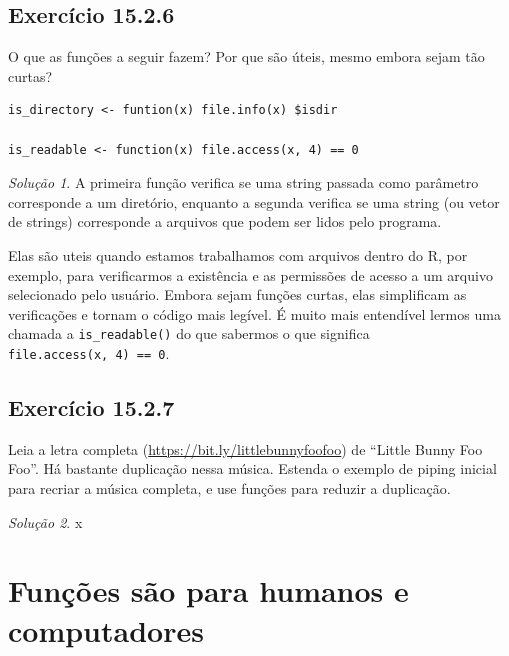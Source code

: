 \documentclass[
]{latex/krantz}
\theoremstyle{definition}
\theoremstyle{definition}
\theoremstyle{definition}
\theoremstyle{definition}
\theoremstyle{remark}
\newtheorem*{solution}{Solução}
\begin{document}
\hypertarget{exr15-2-6}{%
\subsection*{Exercício 15.2.6}\label{exr15-2-6}}

O que as funções a seguir fazem? Por que são úteis, mesmo embora sejam tão curtas?

\begin{verbatim}
is_directory <- funtion(x) file.info(x) $isdir

is_readable <- function(x) file.access(x, 4) == 0
\end{verbatim}

\begin{solution}
A primeira função verifica se uma string passada como parâmetro corresponde a um diretório, enquanto a segunda verifica se uma string (ou vetor de strings) corresponde a arquivos que podem ser lidos pelo programa.

Elas são uteis quando estamos trabalhamos com arquivos dentro do R, por exemplo, para verificarmos a existência e as permissões de acesso a um arquivo selecionado pelo usuário. Embora sejam funções curtas, elas simplificam as verificações e tornam o código mais legível. É muito mais entendível lermos uma chamada a \texttt{is\_readable()} do que sabermos o que significa \texttt{file.access(x,\ 4)\ ==\ 0}.
\end{solution}

\hypertarget{exr15-2-7}{%
\subsection*{Exercício 15.2.7}\label{exr15-2-7}}

Leia a letra completa (\url{https://bit.ly/littlebunnyfoofoo}) de ``Little Bunny Foo Foo''. Há bastante duplicação nessa música. Estenda o exemplo de piping inicial para recriar a música completa, e use funções para reduzir a duplicação.

\begin{solution}
x
\end{solution}

\hypertarget{funuxe7uxf5es-suxe3o-para-humanos-e-computadores}{%
\section{Funções são para humanos e computadores}\label{funuxe7uxf5es-suxe3o-para-humanos-e-computadores}}
\end{document}
